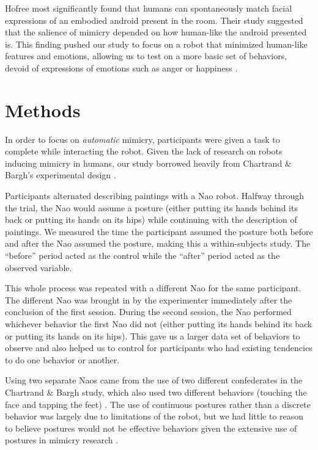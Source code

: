 \documentclass{acm_proc_article-sp}
\begin{document}
Hofree most significantly found that humans can spontaneously match facial expressions of an embodied android present in the room. Their study suggested that the salience of mimicry depended on how human-like the android presented is. This finding pushed our study to focus on a robot that minimized human-like features and emotions, allowing us to test on a more basic set of behaviors, devoid of expressions of emotions such as anger or happiness \cite{hofree2014bridging}. 

\section{Methods} 
In order to focus on \textit{automatic} mimicry, participants were given a task to complete while interacting the robot. Given the lack of research on robots inducing mimicry in humans, our study borrowed heavily from Chartrand \& Bargh's experimental design \cite{chartrand1999chameleon}. 

Participants alternated describing paintings with a Nao robot. Halfway through the trial, the Nao would assume a posture (either putting its hands behind its back or putting its hands on its hips) while continuing with the description of paintings. We measured the time the participant assumed the posture both before and after the Nao assumed the posture, making this a within-subjects study. The ``before'' period acted as the control while the ``after'' period acted as the observed variable.

This whole process was repeated with a different Nao for the same participant. The different Nao was brought in by the experimenter immediately after the conclusion of the first session. During the second session, the Nao performed whichever behavior the first Nao did not (either putting its hands behind its back or putting its hands on its hips). This gave us a larger data set of behaviors to observe and also helped us to control for participants who had existing tendencies to do one behavior or another.

Using two separate Naos came from the use of two different confederates in  the Chartrand \& Bargh study, which also used two different behaviors (touching the face and tapping the feet) \cite{chartrand1999chameleon}. The use of continuous postures rather than a discrete behavior was largely due to limitations of the robot, but we had little to reason to believe postures would not be effective behaviors given the extensive use of postures in mimicry research \cite{chartrand2013antecedents}. 
\end{document}
